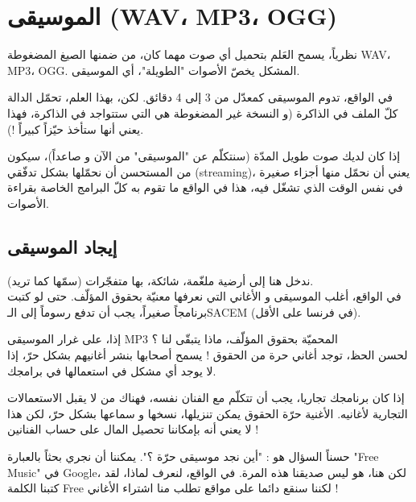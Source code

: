 \section{الموسيقى (\textenglish{WAV}، \textenglish{MP3}، \textenglish{OGG})}

نظرياً، يسمح العَلم
بتحميل أي صوت مهما كان، من ضمنها الصيغ المضغوطة
\textenglish{WAV}، \textenglish{MP3}، \textenglish{OGG}.
 المشكل يخصّ الأصوات "الطويلة"، أي الموسيقى.
 
في الواقع، تدوم الموسيقى كمعدّل من 3 إلى 4 دقائق. لكن، بهذا العلم، تحمّل الدالة\\
كلّ الملف في الذاكرة (و النسخة غير المضغوطة هي التي ستتواجد في الذاكرة، فهذا يعني أنها ستأخذ حيّزاً كبيراً !).

إذا كان لديك صوت طويل المدّة (سنتكلّم عن "الموسيقى" من الآن و صاعداً)، سيكون من المستحسن أن نحمّلها بشكل تدفّقي
(\textenglish{streaming})،
يعني أن نحمّل منها أجزاء صغيرة في نفس الوقت الذي تشغّل فيه، هذا في الواقع ما تقوم به كلّ البرامج الخاصة بقراءة الأصوات.

\subsection{إيجاد الموسيقى}

ندخل هنا إلى أرضية ملغّمة، شائكة، بها متفجّرات (سمّها كما تريد).\\
في الواقع، أغلب الموسيقى و الأغاني التي نعرفها معنيّة بحقوق المؤلّف. حتى لو كتبت برنامجاً صغيراً، يجب أن تدفع رسوماً إلى الـ\textenglish{SACEM}
(في فرنسا على الأقل).

إذا، على غرار الموسيقى
\textenglish{MP3}
المحميّة بحقوق المؤلّف، ماذا يتبقّى لنا ؟\\
لحسن الحظ، توجد أغاني حرة من الحقوق ! يسمح أصحابها بنشر أغانيهم بشكل حرّ، إذا لا يوجد أي مشكل في استعمالها في برامجك.

\begin{warning}
إذا كان برنامجك تجاريا، يجب أن تتكلّم مع الفنان نفسه، فهناك من لا يقبل الاستعمالات التجارية لأغانيه. الأغنية حرّة الحقوق يمكن تنزيلها، نسخها و سماعها بشكل حرّ، لكن هذا لا يعني أنه بإمكاننا تحصيل المال على حساب الفنانين !
\end{warning}

حسناً السؤال هو : "أين نجد موسيقى حرّة ؟". يمكننا أن نجري بحثاً بالعبارة
"\textenglish{Free Music}"
في
\textenglish{Google}،
لكن هنا، هو ليس صديقنا هذه المرة. في الواقع، لنعرف لماذا، لقد كتبنا الكلمة
\textenglish{Free}
لكننا سنقع دائما على مواقع تطلب منا اشتراء الأغاني  !

